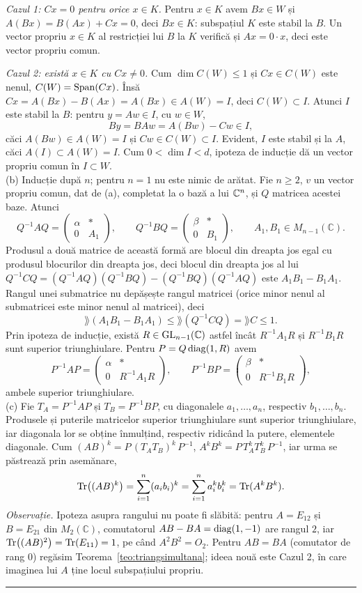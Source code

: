 \emph{Cazul 1: $Cx=0$ pentru orice $x\in K$.} Pentru $x\in K$ avem $Bx\in W$ și $A(Bx)=B(Ax)+Cx=0$, deci $Bx\in K$: subspațiul $K$ este stabil la $B$. Un vector propriu $x\in K$ al restricției lui $B$ la $K$ verifică și $Ax=0\cdot x$, deci este vector propriu comun.

\emph{Cazul 2: există $x\in K$ cu $Cx\neq0$.} Cum $\dim C(W)\le1$ și $Cx\in C(W)$ este nenul, $C(W)=\operatorname{Span}(Cx)$. Însă $Cx=A(Bx)-B(Ax)=A(Bx)\in A(W)=I$, deci $C(W)\subset I$. Atunci $I$ este stabil la $B$: pentru $y=Aw\in I$, cu $w\in W$,
\[ By=BAw=A(Bw)-Cw\in I, \]
căci $A(Bw)\in A(W)=I$ și $Cw\in C(W)\subset I$. Evident, $I$ este stabil și la $A$, căci $A(I)\subset A(W)=I$. Cum $0<\dim I<d$, ipoteza de inducție dă un vector propriu comun în $I\subset W$.\\[2pt]
(b) Inducție după $n$; pentru $n=1$ nu este nimic de arătat. Fie $n\ge2$, $v$ un vector propriu comun, dat de (a), completat la o bază a lui $\mathbb{C}^n$, și $Q$ matricea acestei baze. Atunci
\[ Q^{-1}AQ=\begin{pmatrix}\alpha&*\\0&A_1\end{pmatrix},\qquad Q^{-1}BQ=\begin{pmatrix}\beta&*\\0&B_1\end{pmatrix},\qquad A_1,B_1\in M_{n-1}(\mathbb{C}). \]
Produsul a două matrice de această formă are blocul din dreapta jos egal cu produsul blocurilor din dreapta jos, deci blocul din dreapta jos al lui $Q^{-1}CQ=(Q^{-1}AQ)(Q^{-1}BQ)-(Q^{-1}BQ)(Q^{-1}AQ)$ este $A_1B_1-B_1A_1$. Rangul unei submatrice nu depășește rangul matricei (orice minor nenul al submatricei este minor nenul al matricei), deci
\[ \rang(A_1B_1-B_1A_1)\le\rang(Q^{-1}CQ)=\rang C\le1. \]
Prin ipoteza de inducție, există $R\in\mathrm{GL}_{n-1}(\mathbb{C})$ astfel încât $R^{-1}A_1R$ și $R^{-1}B_1R$ sunt superior triunghiulare. Pentru $P=Q\operatorname{diag}(1,R)$ avem
\[ P^{-1}AP=\begin{pmatrix}\alpha&*\\0&R^{-1}A_1R\end{pmatrix},\qquad P^{-1}BP=\begin{pmatrix}\beta&*\\0&R^{-1}B_1R\end{pmatrix}, \]
ambele superior triunghiulare.\\[2pt]
(c) Fie $T_A=P^{-1}AP$ și $T_B=P^{-1}BP$, cu diagonalele $a_1,\dots,a_n$, respectiv $b_1,\dots,b_n$. Produsele și puterile matricelor superior triunghiulare sunt superior triunghiulare, iar diagonala lor se obține înmulțind, respectiv ridicând la putere, elementele diagonale. Cum $(AB)^k=P\,(T_AT_B)^k\,P^{-1}$, $A^kB^k=P\,T_A^kT_B^k\,P^{-1}$, iar urma se păstrează prin asemănare,
\[ \operatorname{Tr}\bigl((AB)^k\bigr)=\sum_{i=1}^n(a_ib_i)^k=\sum_{i=1}^na_i^kb_i^k=\operatorname{Tr}(A^kB^k). \]
\emph{Observație.} Ipoteza asupra rangului nu poate fi slăbită: pentru $A=E_{12}$ și $B=E_{21}$ din $M_2(\mathbb{C})$, comutatorul $AB-BA=\operatorname{diag}(1,-1)$ are rangul $2$, iar $\operatorname{Tr}\bigl((AB)^2\bigr)=\operatorname{Tr}(E_{11})=1$, pe când $A^2B^2=O_2$. Pentru $AB=BA$ (comutator de rang $0$) regăsim Teorema~\ref{teo:triangsimultana}; ideea nouă este Cazul 2, în care imaginea lui $A$ ține locul subspațiului propriu.
\vspace{1mm}\hrule

